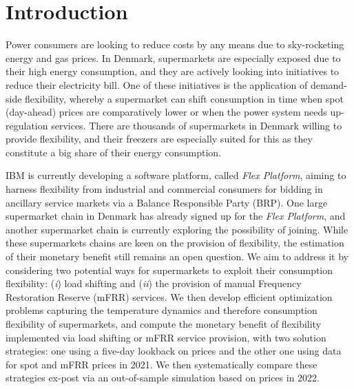 \vspace{-0.2cm}
\section{Introduction}

Power consumers are looking to reduce costs by any means due to sky-rocketing energy and gas prices. In Denmark, supermarkets are especially exposed due to their high energy consumption, and they are actively looking into initiatives to reduce their electricity bill. One of these initiatives is the application of demand-side flexibility, whereby a supermarket can shift consumption in time when spot (day-ahead) prices are comparatively lower or when the power system needs up-regulation services. There are thousands of supermarkets in Denmark willing to provide flexibility, and their freezers are especially suited for this as they constitute a big share of their energy consumption.

IBM is currently developing a software platform, called \textit{Flex Platform}, aiming to harness flexibility from industrial and commercial consumers for bidding in ancillary service markets via a Balance Responsible Party (BRP). One large supermarket chain in Denmark has already signed up for the \textit{Flex Platform}, and another supermarket chain is currently exploring the possibility of joining.
While these supermarkets chains are keen on the provision of flexibility, the estimation of their monetary benefit still remains an open question. We aim to address it by considering two potential ways for supermarkets to exploit their consumption flexibility: (\textit{i}) load shifting and (\textit{ii}) the provision of manual Frequency Restoration Reserve (mFRR)
services. We then develop efficient optimization problems capturing the temperature dynamics and therefore consumption flexibility of supermarkets, and compute the monetary benefit of flexibility implemented via load shifting or mFRR service provision, with two solution strategies: one using a five-day lookback on prices and the other one using data for spot and mFRR prices in 2021. We then systematically compare these strategies ex-post via an out-of-sample simulation based on prices in 2022.


